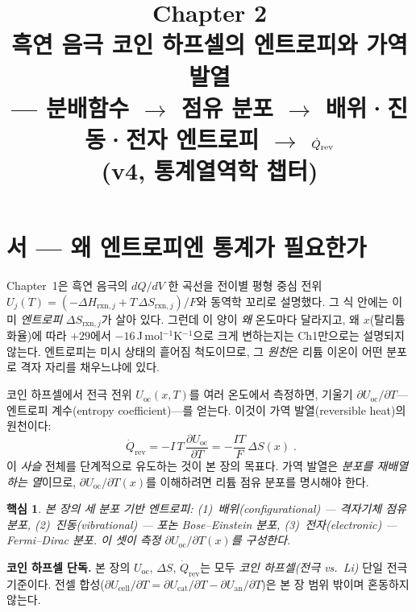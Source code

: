 \documentclass[11pt,a4paper]{article}
\title{\textbf{\LARGE Chapter 2}\\[0.35em]
  \Large 흑연 음극 코인 하프셀의 엔트로피와 가역 발열\\[0.2em]
  \large --- 분배함수 $\to$ 점유 분포 $\to$ 배위·진동·전자 엔트로피 $\to$ $\dot{Q}_{\rev}$\\[0.15em]
  \normalsize (v4, 통계열역학 챕터)}
\author{}\date{}
\newtheorem*{keybox}{핵심}
\newcommand{\rxn}{\mathrm{rxn}}
\newcommand{\rev}{\mathrm{rev}}
\newcommand{\oc}{\mathrm{oc}}
\begin{document}
\maketitle
\tableofcontents
\clearpage

\section*{서 --- 왜 엔트로피엔 통계가 필요한가}
\label{sec:intro}

Chapter~1은 흑연 음극의 $dQ/dV$ 한 곡선을 전이별 평형 중심 전위
$U_j(T)=(-\Delta H_{\rxn,j}+T\,\Delta S_{\rxn,j})/F$와 동역학 꼬리로 설명했다.
그 식 안에는 이미 \emph{엔트로피} $\Delta S_{\rxn,j}$가 살아 있다.
그런데 이 양이 \emph{왜} 온도마다 달라지고,
왜 $x$(탈리튬화율)에 따라 $+29$에서 $-16$\,J\,mol$^{-1}$K$^{-1}$으로 크게 변하는지는
Ch1만으로는 설명되지 않는다.
엔트로피는 미시 상태의 흩어짐 척도이므로, 그 \emph{원천}은 리튬 이온이 어떤 분포로 격자 자리를
채우느냐에 있다.

코인 하프셀에서 전극 전위 $U_{\oc}(x,T)$를 여러 온도에서 측정하면,
기울기 $\partial U_{\oc}/\partial T$---엔트로피 계수(entropy coefficient)---를 얻는다.
이것이 가역 발열(reversible heat)의 원천이다:
\begin{equation}
  \boxed{\;\dot{Q}_{\rev}=-I\,T\,\frac{\partial U_{\oc}}{\partial T}
    =-\frac{IT}{F}\,\Delta S(x)\;.}
  \label{eq:qrev_def}
\end{equation}
이 \emph{사슬} 전체를 단계적으로 유도하는 것이 본 장의 목표다.
가역 발열은 \emph{분포를 재배열하는 열}이므로,
$\partial U_{\oc}/\partial T(x)$를 이해하려면 리튬 점유 분포를 명시해야 한다.

\begin{keybox}
본 장의 세 분포 기반 엔트로피:
(1)~배위(configurational) --- 격자기체 점유 분포,
(2)~진동(vibrational) --- 포논 Bose--Einstein 분포,
(3)~전자(electronic) --- Fermi--Dirac 분포.
이 셋이 측정 $\partial U_{\oc}/\partial T(x)$를 구성한다.
\end{keybox}

\medskip\noindent
\textbf{코인 하프셀 단독.}\;
본 장의 $U_{\oc}$, $\Delta S$, $\dot{Q}_{\rev}$는 모두 \emph{코인 하프셀(전극 vs.\ Li)}
단일 전극 기준이다. 전셀 합성($\partial U_{\mathrm{cell}}/\partial T
=\partial U_{\mathrm{cat}}/\partial T - \partial U_{\mathrm{an}}/\partial T$)은
본 장 범위 밖이며 혼동하지 않는다.
\end{document}
